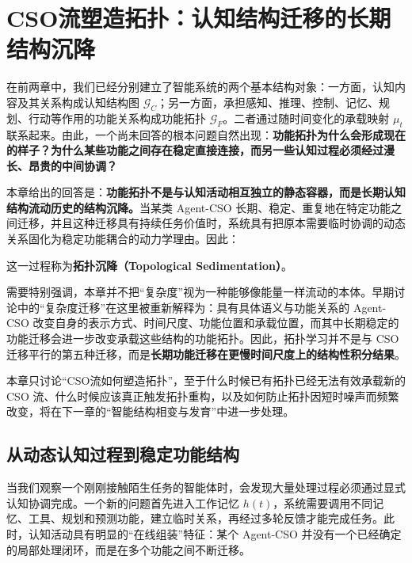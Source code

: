 \chapter{CSO流塑造拓扑：认知结构迁移的长期结构沉降}

\begin{chapterlead}
在前两章中，我们已经分别建立了智能系统的两个基本结构对象：一方面，认知内容及其关系构成认知结构图 $\mathcal{G}_{C}$；另一方面，承担感知、推理、控制、记忆、规划、行动等作用的功能关系构成功能拓扑 $\mathcal{G}_{F}$。二者通过随时间变化的承载映射 $\mu_t$ 联系起来。由此，一个尚未回答的根本问题自然出现：\textbf{功能拓扑为什么会形成现在的样子？为什么某些功能之间存在稳定直接连接，而另一些认知过程必须经过漫长、昂贵的中间协调？}

本章给出的回答是：\textbf{功能拓扑不是与认知活动相互独立的静态容器，而是长期认知结构流动历史的结构沉降。}当某类 Agent-CSO 长期、稳定、重复地在特定功能之间迁移，并且这种迁移具有持续任务价值时，系统具有把原本需要临时协调的动态关系固化为稳定功能耦合的动力学理由。因此：
\begin{statementbox}
\centering
{}
\end{statementbox}
这一过程称为\textbf{拓扑沉降（Topological Sedimentation）}。

需要特别强调，本章并不把``复杂度''视为一种能够像能量一样流动的本体。早期讨论中的``复杂度迁移''在这里被重新解释为：具有具体语义与功能关系的 Agent-CSO 改变自身的表示方式、时间尺度、功能位置和承载位置，而其中长期稳定的功能迁移会进一步改变承载这些结构的功能拓扑。因此，拓扑学习并不是与 CSO 迁移平行的第五种迁移，而是\textbf{长期功能迁移在更慢时间尺度上的结构性积分结果}。

本章只讨论``CSO流如何塑造拓扑''，至于什么时候已有拓扑已经无法有效承载新的 CSO 流、什么时候应该真正触发拓扑重构，以及如何防止拓扑因短时噪声而频繁改变，将在下一章的``智能结构相变与发育''中进一步处理。
\end{chapterlead}


\section{从动态认知过程到稳定功能结构}

当我们观察一个刚刚接触陌生任务的智能体时，会发现大量处理过程必须通过显式认知协调完成。一个新的问题首先进入工作记忆 $h(t)$，系统需要调用不同记忆、工具、规划和预测功能，建立临时关系，再经过多轮反馈才能完成任务。此时，认知活动具有明显的``在线组装''特征：某个 Agent-CSO 并没有一个已经确定的局部处理闭环，而是在多个功能之间不断迁移。

